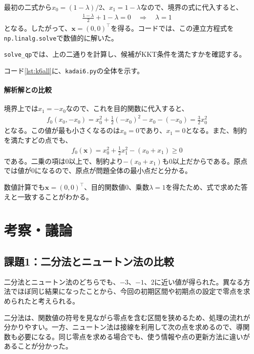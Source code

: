 \documentclass[a4j]{jarticle}
\begin{document}
最初の二式から$x_0=(1-\lambda)/2$、$x_1=1-\lambda$なので、境界の式に代入すると、
\begin{align}
  \frac{1-\lambda}{2}+1-\lambda=0
  \quad\Longrightarrow\quad\lambda=1
\end{align}
となる。したがって、$\bm{x}=(0,0)^\top$を得る。コードでは、この連立方程式を\texttt{np.linalg.solve}で数値的に解いた。

\texttt{solve\_qp}では、上の二通りを計算し、候補がKKT条件を満たすかを確認する。

\par\noindent
コード\ref{lst:k6all}に、\texttt{kadai6.py}の全体を示す。
\par


\paragraph{解析解との比較}
境界上では$x_1=-x_0$なので、これを目的関数に代入すると、
\begin{align}
  f_0(x_0,-x_0)
  =x_0^2+\frac12(-x_0)^2-x_0-(-x_0)
  =\frac32x_0^2
\end{align}
となる。この値が最も小さくなるのは$x_0=0$であり、$x_1=0$となる。また、制約を満たすどの点でも、
\begin{align}
  f_0(\bm{x})=x_0^2+\frac12x_1^2-(x_0+x_1)\ge0
\end{align}
である。二乗の項は0以上で、制約より$-(x_0+x_1)$も0以上だからである。原点では値が0になるので、原点が問題全体の最小点だと分かる。

数値計算でも$\bm{x}=(0,0)^\top$、目的関数値0、乗数$\lambda=1$を得たため、式で求めた答えと一致することがわかる。

\clearpage
\section{考察・議論}
\subsection{課題1：二分法とニュートン法の比較}
二分法とニュートン法のどちらでも、$-3$、$-1$、$2$に近い値が得られた。異なる方法でほぼ同じ結果になったことから、今回の初期区間や初期点の設定で零点を求められたと考えられる。

二分法は、関数値の符号を見ながら零点を含む区間を狭めるため、処理の流れが分かりやすい。一方、ニュートン法は接線を利用して次の点を求めるので、導関数も必要になる。同じ零点を求める場合でも、使う情報や点の更新方法に違いがあることが分かった。
\end{document}
